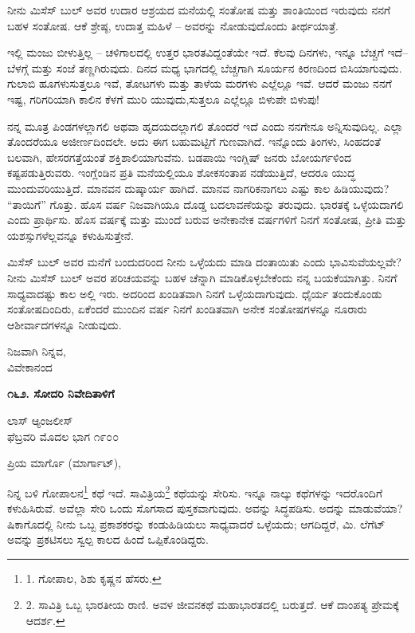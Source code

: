 ನೀನು ಮಿಸೆಸ್ ಬುಲ್ ಅವರ ಉದಾರ ಆಶ್ರಯದ ಮನೆಯಲ್ಲಿ ಸಂತೋಷ ಮತ್ತು ಶಾಂತಿಯಿಂದ ಇರುವುದು ನನಗೆ ಬಹಳ ಸಂತೋಷ. ಆಕೆ ಶ್ರೇಷ್ಠ, ಉದಾತ್ತ ಮಹಿಳೆ – ಅವರನ್ನು ನೋಡುವುದೊಂದು ತೀರ್ಥಯಾತ್ರೆ.

ಇಲ್ಲಿ ಮಂಜು ಬೀಳುತ್ತಿಲ್ಲ – ಚಳಿಗಾಲದಲ್ಲಿ ಉತ್ತರ ಭಾರತವಿದ್ದಂತೆಯೇ ಇದೆ. ಕೆಲವು ದಿನಗಳು, ಇನ್ನೂ ಬೆಚ್ಚಗೆ ಇದೆ–ಬೆಳಗ್ಗೆ ಮತ್ತು ಸಂಜೆ ತಣ್ಣಗಿರುವುದು. ದಿನದ ಮಧ್ಯ ಭಾಗದಲ್ಲಿ ಬೆಚ್ಚಗಾಗಿ ಸೂರ್ಯನ ಕಿರಣದಿಂದ ಬಿಸಿಯಾಗುವುದು. ಗುಲಾಬಿ ಹೂಗಳುಸುತ್ತಲೂ ಇವೆ, ತೋಟಗಳು ಮತ್ತು ತಾಳೆಯ ಮರಗಳು ಎಲ್ಲೆಲ್ಲೂ ಇವೆ. ಆದರೆ ಮಂಜು ನನಗೆ ಇಷ್ಟ, ಗರಿಗರಿಯಾಗಿ ಕಾಲಿನ ಕೆಳಗೆ ಮುರಿ ಯುವುದು,ಸುತ್ತಲೂ ಎಲ್ಲೆಲ್ಲೂ ಬಿಳುಪೇ ಬಿಳುಪು!

ನನ್ನ ಮೂತ್ರ ಪಿಂಡಗಳಲ್ಲಾಗಲಿ ಅಥವಾ ಹೃದಯದಲ್ಲಾಗಲಿ ತೊಂದರೆ ಇದೆ ಎಂದು ನನಗೇನೂ ಅನ್ನಿಸುವುದಿಲ್ಲ. ಎಲ್ಲಾ ತೊಂದರೆಯೂ ಅಜೀರ್ಣದಿಂದಲೇ. ಅದು ಈಗ ಬಹುಮಟ್ಟಿಗೆ ಗುಣವಾಗಿದೆ. ಇನ್ನೊಂದು ತಿಂಗಳು, ಸಿಂಹದಂತೆ ಬಲವಾಗಿ, ಹೇಸರಗತ್ತೆಯಂತೆ ಶಕ್ತಿಶಾಲಿಯಾಗುವೆನು. ಬಡಪಾಯಿ ಇಂಗ್ಲಿಷ್ ಜನರು ಬೋಯರ್ಗಳಿಂದ ಕಷ್ಟಪಡುತ್ತಿರುವರು. ಇಂಗ್ಲೆಂಡಿನ ಪ್ರತಿ ಮನೆಯಲ್ಲಿಯೂ ಶೋಕಸಂತಾಪ ನಡೆಯುತ್ತಿದೆ, ಆದರೂ ಯುದ್ಧ ಮುಂದುವರಿಯುತ್ತಿದೆ. ಮಾನವನ ದುಷ್ಕಾರ್ಯ ಹಾಗಿದೆ. ಮಾನವ ನಾಗರಿಕನಾಗಲು ಎಷ್ಟು ಕಾಲ ಹಿಡಿಯುವುದು? “ತಾಯಿಗೆ” ಗೊತ್ತು. ಹೊಸ ವರ್ಷ ನಿಜವಾಗಿಯೂ ದೊಡ್ಡ ಬದಲಾವಣೆಯನ್ನು ತರುವುದು. ಭಾರತಕ್ಕೆ ಒಳ್ಳೆಯದಾಗಲಿ ಎಂದು ಪ್ರಾರ್ಥಿಸು. ಹೊಸ ವರ್ಷಕ್ಕೆ ಮತ್ತು ಮುಂದೆ ಬರುವ ಅನೇಕಾನೇಕ ವರ್ಷಗಳಿಗೆ ನಿನಗೆ ಸಂತೋಷ, ಪ್ರೀತಿ ಮತ್ತು ಯಶಸ್ಸುಗಳೆಲ್ಲವನ್ನೂ ಕಳುಹಿಸುತ್ತೇನೆ.

ಮಿಸೆಸ್ ಬುಲ್ ಅವರ ಮನೆಗೆ ಬಂದುದರಿಂದ ನೀನು ಒಳ್ಳೆಯದು ಮಾಡಿ ದಂತಾಯಿತು ಎಂದು ಭಾವಿಸುವೆಯಲ್ಲವೇ? ನೀನು ಮಿಸೆಸ್ ಬುಲ್ ಅವರ ಪರಿಚಯವನ್ನು ಬಹಳ ಚೆನ್ನಾಗಿ ಮಾಡಿಕೊಳ್ಳಬೇಕೆಂದು ನನ್ನ ಬಯಕೆಯಾಗಿತ್ತು. ನಿನಗೆ ಸಾಧ್ಯವಾದಷ್ಟು ಕಾಲ ಅಲ್ಲಿ ಇರು. ಅದರಿಂದ ಖಂಡಿತವಾಗಿ ನಿನಗೆ ಒಳ್ಳೆಯದಾಗುವುದು. ಧೈರ್ಯ ತಂದುಕೊಂಡು ಸಂತೋಷದಿಂದಿರು, ಏಕೆಂದರೆ ಮುಂದಿನ ವರ್ಷ ನಿನಗೆ ಖಂಡಿತವಾಗಿ ಅನೇಕ ಸಂತೋಷಗಳನ್ನೂ ನೂರಾರು ಆಶೀರ್ವಾದಗಳನ್ನೂ ನೀಡುವುದು.

\begin{flushright}
ನಿಜವಾಗಿ ನಿನ್ನವ,\\ವಿವೇಕಾನಂದ
\end{flushright}

\begin{center}
\textbf{೧೬೨. ಸೋದರಿ ನಿವೇದಿತಾಳಿಗೆ}
\end{center}

\begin{flushright}
ಲಾಸ್ ಆ್ಯಂಜಲೀಸ್\\ಫೆಬ್ರವರಿ ಮೊದಲ ಭಾಗ ೧೯೦೦
\end{flushright}

ಪ್ರಿಯ ಮಾರ್ಗೊ (ಮಾರ್ಗಾಟ್),

ನಿನ್ನ ಬಳಿ ಗೋಪಾಲನ\footnote{1. ಗೋಪಾಲ, ಶಿಶು ಕೃಷ್ಣನ ಹೆಸರು.} ಕಥೆ ಇದೆ. ಸಾವಿತ್ರಿಯ\footnote{2. ಸಾವಿತ್ರಿ ಒಬ್ಬ ಭಾರತೀಯ ರಾಣಿ. ಅವಳ ಜೀವನಕಥೆ ಮಹಾಭಾರತದಲ್ಲಿ ಬರುತ್ತದೆ. ಆಕೆ ದಾಂಪತ್ಯ ಪ್ರೇಮಕ್ಕೆ ಆದರ್ಶ.} ಕಥೆಯನ್ನು ಸೇರಿಸು. ಇನ್ನೂ ನಾಲ್ಕು ಕಥೆಗಳನ್ನು ಇದರೊಂದಿಗೆ ಕಳುಹಿಸಿರುವೆ. ಅವೆಲ್ಲಾ ಸೇರಿ ಒಂದು ಸೊಗಸಾದ ಪುಸ್ತಕವಾಗುವುದು. ಅವನ್ನು ಸಿದ್ಧಪಡಿಸು. ಅದನ್ನು ಮಾಡುವೆಯಾ? ಷಿಕಾಗೊದಲ್ಲಿ ನೀನು ಒಬ್ಬ ಪ್ರಕಾಶಕರನ್ನು ಕಂಡುಹಿಡಿಯಲು ಸಾಧ್ಯವಾದರೆ ಒಳ್ಳೆಯದು; ಆಗದಿದ್ದರೆ, ಮಿ. ಲೆಗೆಟ್ ಅವನ್ನು ಪ್ರಕಟಿಸಲು ಸ್ವಲ್ಪ ಕಾಲದ ಹಿಂದೆ ಒಪ್ಪಿಕೊಂಡಿದ್ದರು.

